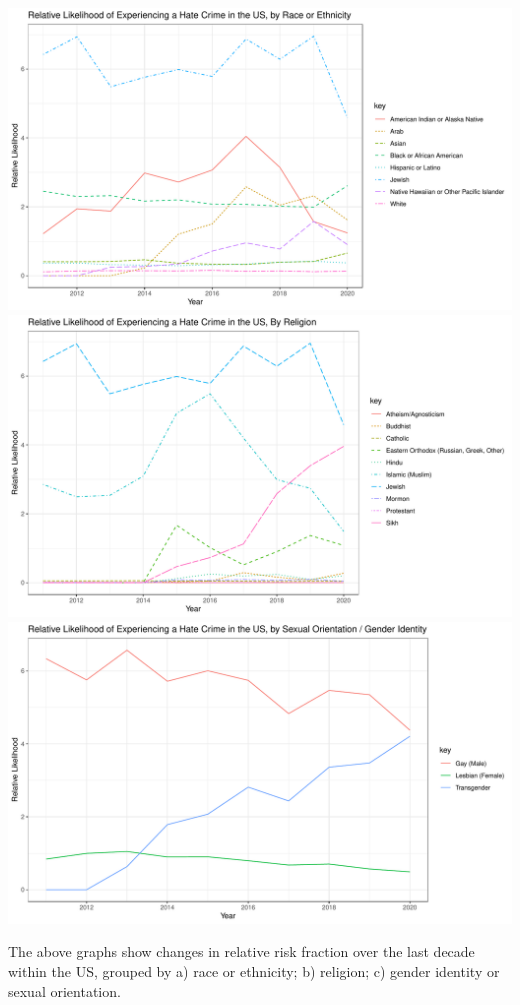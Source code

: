\documentclass[
]{article}
\begin{document}
\includegraphics{demographics_of_hate_files/figure-latex/unnamed-chunk-1-1.pdf}
\includegraphics{demographics_of_hate_files/figure-latex/unnamed-chunk-1-2.pdf}
\includegraphics{demographics_of_hate_files/figure-latex/unnamed-chunk-1-3.pdf}

The above graphs show changes in relative risk fraction over the last
decade within the US, grouped by a) race or ethnicity; b) religion; c)
gender identity or sexual orientation.
\end{document}
